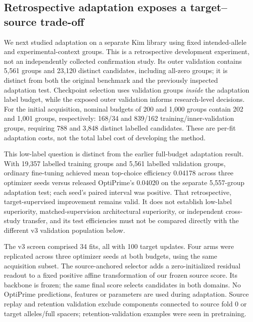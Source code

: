 \subsection{Retrospective adaptation exposes a target--source trade-off}
\label{sec:adaptation-followup}

We next studied adaptation on a separate Kim library using fixed intended-allele
and experimental-context groups. This is a retrospective development experiment,
not an independently collected confirmation study. Its outer validation contains
5{,}561 groups and 23{,}120 distinct candidates, including all-zero groups; it is
distinct from both the original benchmark and the previously inspected adaptation
test. Checkpoint selection uses validation groups \emph{inside} the adaptation
label budget, while the exposed outer validation informs research-level decisions.
For the initial acquisition, nominal budgets of 200 and 1{,}000 groups contain
202 and 1{,}001 groups,
respectively: 168/34 and 839/162 training/inner-validation groups, requiring 788
and 3{,}848 distinct labelled candidates. These are per-fit adaptation costs, not
the total label cost of developing the method.

This low-label question is distinct from the earlier full-budget adaptation
result. With 19{,}357 labelled training groups and 5{,}561 labelled validation
groups, ordinary fine-tuning achieved mean top-choice efficiency 0.04178 across
three optimizer seeds versus released OptiPrime's 0.04020 on the separate
5{,}557-group adaptation test; each seed's paired interval was positive. That
retrospective, target-supervised improvement remains valid. It does not establish
low-label superiority, matched-supervision architectural superiority, or
independent cross-study transfer, and its test efficiencies must not be compared
directly with the different v3 validation population below.

The v3 screen comprised 34 fits, all with 100 target updates. Four arms were
replicated across three optimizer seeds at both budgets, using the same acquisition
subset. The source-anchored selector adds a zero-initialized residual readout to a
fixed positive affine transformation of our frozen source score. Its backbone is
frozen; the same final score selects candidates in both domains. No OptiPrime
predictions, features or parameters are used during adaptation. Source replay and
retention validation exclude components connected to source fold 0 or target
alleles/full spacers; retention-validation examples were seen in pretraining.

